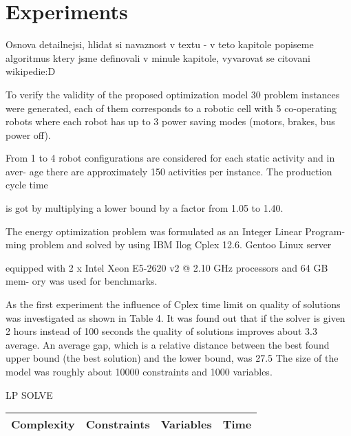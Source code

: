 \chapter{Experiments}

Osnova detailnejsi, hlidat si navaznost v textu - v teto kapitole popiseme algoritmus ktery jsme definovali v minule kapitole, vyvarovat se citovani wikipedie:D




To verify the validity of the proposed optimization model 30 problem instances were
generated, each of them corresponds to a robotic cell with 5 co-operating robots
where each robot has up to 3 power saving modes (motors, brakes, bus power off).

From 1 to 4 robot configurations are considered for each static activity and in aver-
age there are approximately 150 activities per instance. The production cycle time

is got by multiplying a lower bound by a factor from 1.05 to 1.40.

The energy optimization problem was formulated as an Integer Linear Program-
ming problem and solved by using IBM Ilog Cplex 12.6. Gentoo Linux server

equipped with 2 x Intel Xeon E5-2620 v2 @ 2.10 GHz processors and 64 GB mem-
ory was used for benchmarks.

As the first experiment the influence of Cplex time limit on quality of solutions
was investigated as shown in Table 4. It was found out that if the solver is given
2 hours instead of 100 seconds the quality of solutions improves about 3.3 %
average. An average gap, which is a relative distance between the best found upper
bound (the best solution) and the lower bound, was 27.5 %
The size of the model was roughly about 10000 constraints and 1000 variables.


LP SOLVE

\begin{center}
\begin{tabular}{|c|c|c|c|}
    \hline
    Complexity & Constraints & Variables & Time \\
    \hline
    
    \hline
\end{tabular}
\end{center}